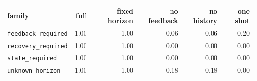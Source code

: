 \begin{tabular}{lrrrrr}
\toprule
family & full & fixed horizon & no feedback & no history & one shot \\
\midrule
\texttt{feedback\_required} & 1.00 & 1.00 & 0.06 & 0.06 & 0.20 \\
\texttt{recovery\_required} & 1.00 & 1.00 & 0.00 & 0.00 & 0.00 \\
\texttt{state\_required} & 1.00 & 1.00 & 0.00 & 0.00 & 0.00 \\
\texttt{unknown\_horizon} & 1.00 & 1.00 & 0.18 & 0.18 & 0.00 \\
\bottomrule
\end{tabular}
